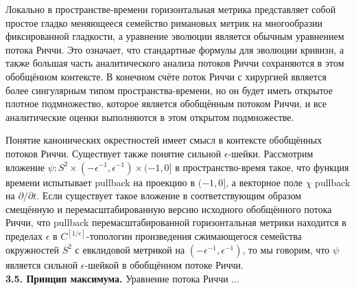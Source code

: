 Локально в пространстве-времени горизонтальная метрика 
представляет собой простое гладко меняющееся семейство 
римановых метрик на многообразии фиксированной гладкости, 
а уравнение эволюции является обычным уравнением потока 
Риччи. Это означает, что стандартные формулы для эволюции 
кривизн, а также большая часть аналитического анализа 
потоков Риччи сохраняются в этом обобщённом контексте. 
В конечном счёте поток Риччи с хирургией является более 
сингулярным типом пространства-времени, но он будет иметь 
открытое плотное подмножество, которое является 
обобщённым потоком Риччи, и все аналитические оценки 
выполняются в этом открытом подмножестве.

Понятие канонических окрестностей имеет смысл в контексте 
обобщённых потоков Риччи. Существует также понятие сильной 
$ \epsilon $-шейки. Рассмотрим вложение 
$ \psi : S^2 \times (-\epsilon^{-1}, \epsilon^{-1}) \times (-1, 0] $ 
в пространство-время такое, что функция времени испытывает pullback 
на проекцию в $ (-1, 0] $, а векторное поле $ \chi $ 
pullback на $ \partial / \partial t $. Если существует 
такое вложение в соответствующим образом смещённую и 
перемасштабированную версию исходного обобщённого потока Риччи, 
что pullback перемасштабированной горизонтальная метрики 
находится в пределах $ \epsilon $ в $ C^{[1/\epsilon]} $-топологии 
произведения сжимающегося семейства окружностей $ S^2 $ с евклидовой 
метрикой на $ (-\epsilon^{-1}, \epsilon^{-1}) $, то мы говорим, 
что $ \psi $ является сильной $ \epsilon $-шейкой в обобщённом 
потоке Риччи.\\

\textbf{3.5. Принцип максимума.} Уравнение потока Риччи ...
